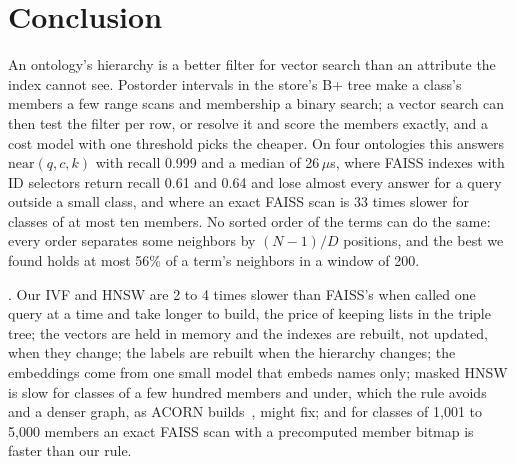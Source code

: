 \section{Conclusion}
\label{sec-conclude}

An ontology's hierarchy is a better filter for vector search than an attribute the
index cannot see.
Postorder intervals in the store's B+ tree make a class's members a few range scans and
membership a binary search; a vector search can then test the filter per row, or
resolve it and score the members exactly, and a cost model with one threshold picks the
cheaper.
On four ontologies this answers $\mathrm{near}(q,c,k)$ with recall 0.999 and a median of
26\,$\mu$s, where FAISS indexes with ID selectors return recall 0.61 and 0.64 and lose
almost every answer for a query outside a small class, and where an exact FAISS scan is
33 times slower for classes of at most ten members.
No sorted order of the terms can do the same: every order separates some neighbors by
$(N{-}1)/D$ positions, and the best we found holds at most 56\% of a term's neighbors in
a window of 200.

.
Our IVF and HNSW are 2 to 4 times slower than FAISS's when called one query at a time and
take longer to build, the price of keeping lists in the triple tree; the vectors are held
in memory and the indexes are rebuilt, not updated, when they change; the labels are
rebuilt when the hierarchy changes; the embeddings come from one small model that
embeds names only; masked HNSW is slow for classes of a few hundred members and under,
which the rule avoids and a denser graph, as ACORN builds~\cite{patel2024}, might fix;
and for classes of 1,001 to 5,000 members an exact FAISS scan with a precomputed member
bitmap is faster than our rule.
